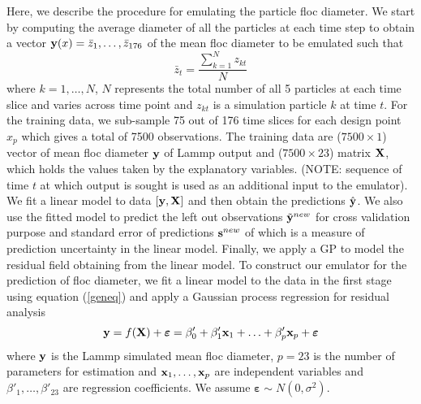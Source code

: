 \documentclass[12pt,titlepage]{report}
\newcommand{\bx}{{\bf x}}
\newcommand{\bX}{{\bf X}}
\newcommand{\by}{{\bf y}}
\newcommand{\tby}{{\tilde {\bf y}}}
\newcommand{\hby}{{\hat {\bf y}}}
\newcommand{\bs}{{\bf s}}
\theoremstyle{definition}
\theoremstyle{remark}
\begin{document}
Here, we describe the procedure for emulating the particle floc diameter. We start by computing the average diameter of all the particles at each time step to obtain a vector $\by(x)=\bar z_1,\ldots,\bar z_{176}$ of the mean floc diameter to be emulated such that
\begin{equation}
\bar z_t=\frac{\sum^N_{k=1} z_{kt}}{N}
\end{equation}
where $k=1,\ldots, N$, $N$ represents the total number of all 5 particles at each time slice and varies across time point and $z_{kt}$ is a simulation particle $k$ at time $t$.
For the training data, we sub-sample 75 out of 176 time slices for each design point $x_p$ which gives a total of 7500 observations.
The training data are ($7500 \times 1$) vector of mean floc diameter $\by$ of Lammp output and ($7500 \times 23$) matrix $\bX$, which holds the values taken by the explanatory variables. (NOTE: sequence of time $t$ at which output is sought is used as an additional input to the emulator). We fit a linear model to data $[\by,\bX]$ and then obtain the predictions $\hby$.
We also use the fitted model to predict the left out observations $\tby^{new}$ for cross validation purpose and standard error of predictions $\bs^{new}$ of which is a measure of prediction uncertainty in the linear model. Finally, we apply a GP to model the residual field obtaining from the linear model.
To construct our emulator for the prediction of floc diameter, we fit a linear model to the data in the first stage using equation (\ref{geneq}) and apply a Gaussian process regression for residual analysis
\begin{equation}\label{geneq}
\by=f(\textbf{X})+\boldsymbol\varepsilon= \beta'_0+\beta'_{1}\bx_{1}+\ldots +\beta'_{p}\bx_{p}+\boldsymbol\varepsilon
\end{equation}
where $\by$ is the Lammp simulated mean floc diameter, $p=23$ is the number of parameters for estimation and $\bx_1,\ldots,\bx_p$ are independent variables and $\beta'_1,\ldots,\beta'_{23}$ are regression coefficients. We assume $\boldsymbol \varepsilon \sim N(0, \sigma^2)$. 
\end{document}
